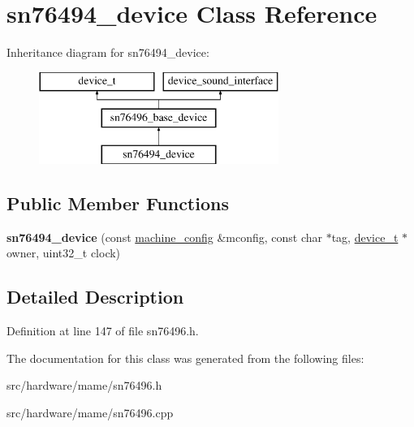 \hypertarget{classsn76494__device}{\section{sn76494\-\_\-device Class Reference}
\label{classsn76494__device}
}
Inheritance diagram for sn76494\-\_\-device\-:\begin{figure}[H]
\begin{center}
\leavevmode
\includegraphics[height=3.000000cm]{classsn76494__device}
\end{center}
\end{figure}
\subsection*{Public Member Functions}
\begin{DoxyCompactItemize}
\item 
\hypertarget{classsn76494__device_a49c5faf1092ead28db777cf845ae60f7}{{\bfseries sn76494\-\_\-device} (const \hyperlink{structmachine__config}{machine\-\_\-config} \&mconfig, const char $\ast$tag, \hyperlink{classdevice__t}{device\-\_\-t} $\ast$owner, uint32\-\_\-t clock)}\label{classsn76494__device_a49c5faf1092ead28db777cf845ae60f7}

\end{DoxyCompactItemize}


\subsection{Detailed Description}


Definition at line 147 of file sn76496.\-h.



The documentation for this class was generated from the following files\-:\begin{DoxyCompactItemize}
\item 
src/hardware/mame/sn76496.\-h\item 
src/hardware/mame/sn76496.\-cpp\end{DoxyCompactItemize}
